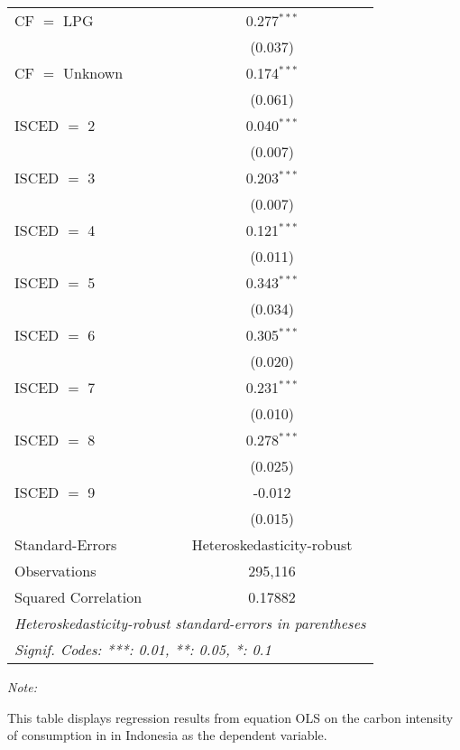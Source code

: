 \begin{table}[htbp!]
\begin{adjustbox}{width = 1\textwidth, max height = 0.95\textheight, center}
\begin{threeparttable}[b]
\begin{tabular}{lc}
            CF $=$ LPG          & 0.277$^{***}$\\   
                                & (0.037)\\   
            CF $=$ Unknown      & 0.174$^{***}$\\   
                                & (0.061)\\   
            ISCED $=$ 2         & 0.040$^{***}$\\   
                                & (0.007)\\   
            ISCED $=$ 3         & 0.203$^{***}$\\   
                                & (0.007)\\   
            ISCED $=$ 4         & 0.121$^{***}$\\   
                                & (0.011)\\   
            ISCED $=$ 5         & 0.343$^{***}$\\   
                                & (0.034)\\   
            ISCED $=$ 6         & 0.305$^{***}$\\   
                                & (0.020)\\   
            ISCED $=$ 7         & 0.231$^{***}$\\   
                                & (0.010)\\   
            ISCED $=$ 8         & 0.278$^{***}$\\   
                                & (0.025)\\   
            ISCED $=$ 9         & -0.012\\   
                                & (0.015)\\   
            \midrule 
            Standard-Errors     & Heteroskedasticity-robust \\   
            Observations        & 295,116\\  
            Squared Correlation & 0.17882\\  
            \midrule \midrule
            \multicolumn{2}{l}{\emph{Heteroskedasticity-robust standard-errors in parentheses}}\\
            \multicolumn{2}{l}{\emph{Signif. Codes: ***: 0.01, **: 0.05, *: 0.1}}\\
         \end{tabular}
         
         \begin{tablenotes}\item \medskip \textit{Note:}
            \item This table displays regression results from equation OLS on the carbon intensity of consumption in  in Indonesia as the dependent variable. 
         \end{tablenotes}
      \end{threeparttable}
   \end{adjustbox}
\end{table}


